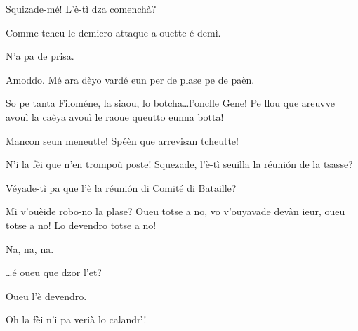 \begin{drama}





\Mammaspeaks{} Squizade-mé! L'è-tì dza comenchà? 

\Spectateurspeaks Comme tcheu le demicro attaque a ouette é demì.

\Vetchotspeaks  N'a pa de prisa.

\Mammaspeaks Amoddo. Mé ara dèyo vardé eun per de plase pe de paèn.


\Mammaspeaks So pe tanta Filoméne, la siaou, lo botcha\ldots l'onclle Gene!  Pe llou  que areuvve avouì la caèya avouì le raoue queutto eunna botta! 


\Mammaspeaks  Mancon seun meneutte! Spéèn que arrevisan tcheutte!


\TsachaouIspeaks N'i la fèi que n'en trompoù poste!  Squezade, l'è-tì seuilla la réuni\'on de la tsasse? 

\Vetchotspeaks Véyade-tì pa que l'è la réuni\'on di Comité di Bataille?

\TsachaouIIspeaks Mi v'ouèide robo-no la plase? Oueu totse a no, vo v'ouyavade devàn ieur, oueu totse a no! Lo devendro totse a no!

\Vetchotspeaks Na, na, na.

\Spectateurspeaks \ldots é oueu que dzor l'et?

\TsachaouIIspeaks Oueu l’è devendro.

\Vetchotspeaks Oh la fèi n'i pa verià lo calandrì!


\end{drama}
